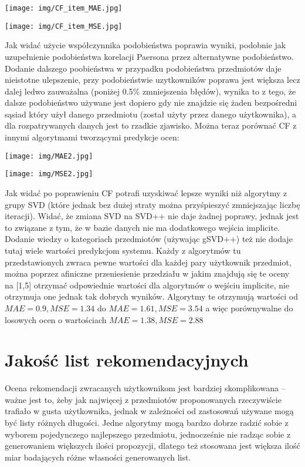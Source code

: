 \documentclass{pracamgr}
\begin{document}
   \begin{center}
    \texttt{[image: img/CF\_item\_MAE.jpg]}
   \end{center}
   \begin{center}
    \texttt{[image: img/CF\_item\_MSE.jpg]}
   \end{center}
   Jak widać użycie współczynnika podobieństwa poprawia wyniki, podobnie jak uzupełnienie podobieństwa korelacji Paersona przez alternatywne podobieństwo.
   Dodanie dalszego poobieństwa w przypadku podobieństwa przedmiotów daje nieistotne ulepszenie,
   przy podobieństwie uzytkowników poprawa jest większa lecz dalej ledwo zauważalna (poniżej 0.5\% zmniejszenia błędów),
   wynika to z tego, że dalsze podobieństwo używane jest dopiero gdy nie znajdzie się żaden bezpośredni sąsiad 
   który użył danego przedmiotu (został użyty przez danego użytkownika), a dla rozpatrywanych danych jest to rzadkie zjawisko.
   Można teraz porównać CF z innymi algorytmami tworzącymi predykcje ocen:
   \begin{center}
    \texttt{[image: img/MAE2.jpg]}
   \end{center}
   \begin{center}
    \texttt{[image: img/MSE2.jpg]}
   \end{center}
   Jak widać po poprawieniu CF potrafi uzyskiwać lepsze wyniki niż algorytmy z grupy SVD
   (które jednak bez dużej straty można przyśpieszyć zmniejszając liczbę iteracji).
   Widać, że zmiana SVD na SVD++ nie daje żadnej poprawy, jednak jest to związane z tym, że w bazie danych nie ma dodatkowego wejścia implicite.
   Dodanie wiedzy o kategoriach przedmiotów (używając gSVD++) też nie dodaje tutaj wiele wartości predykcjom systemu.
   Każdy z algorytmów tu przedstawionych zwraca pewne wartości dla każdej pary użytkownik przedmiot, można poprzez afiniczne przeniesienie przedziału
   w jakim znajdują się te oceny na [1,5] otrzymać odpowiednie wartości dla algorytmów o wejściu implicite, nie otrzymuja one jednak tak dobrych wyników.
   Algorytmy te otrzymują wartości od $MAE=0.9,MSE=1.34$ do $MAE=1.61,MSE=3.54$ a więc porównywalne do losowych ocen o
   wartościach $MAE=1.38,MSE=2.88$
  \section{Jakość list rekomendacyjnych}
   Ocena rekomendacji zwracanych użytkownikom jest bardziej skomplikowana -- ważne jest to, żeby jak najwięcej z przedmiotów proponowanych rzeczywiście trafiało
   w gusta użytkownika, jednak w zależności od zastosowań używane mogą być listy różnych długości.
   Jedne algorytmy mogą bardzo dobrze radzić sobie z wyborem pojedynczego najlepszego przedmiotu,
   jednocześnie nie radząc sobie z generowaniem większych ilości propozycji, dlatego też stosowana
   jest większa ilość miar badających różne własności generowanych list.
\end{document}
